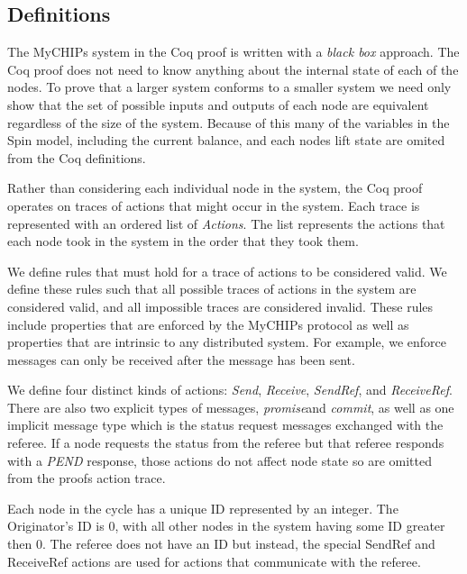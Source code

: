 \documentclass[runningheads]{llncs}
\newcommand{\promise}{\emph{promise}}
\newcommand{\commit}{\emph{commit}}
\newif\ifcomments
\newcommand{\krs}[1]{\ifcomments\textcolor{blue}{krs: #1}\fi}
\begin{document}
\subsection{Definitions} \label{sec:definitions}
The MyCHIPs system in the Coq proof is written with a \emph{black box} approach. The Coq proof does not need to know anything about the internal state of each of the nodes. To prove that a larger system conforms to a smaller system we need only show that the set of possible inputs and outputs of each node are equivalent regardless of the size of the system. Because of this many of the variables in the Spin model, including the current balance, and each nodes lift state are omited from the Coq definitions. 
\krs{We also omit some interactions between the originator and the referee. But the goal of including the originator at all is to provide context for the relay nodes. I need to adjust some language here to better reflect that.}

Rather than considering each individual node in the system, the Coq proof operates on traces of actions that might occur in the system. Each trace is represented with an ordered list of \emph{Actions}. The list represents the actions that each node took in the system in the order that they took them.

We define rules that must hold for a trace of actions to be considered valid. We define these rules such that all possible traces of actions in the system are considered valid, and all impossible traces are considered invalid. These rules include properties that are enforced by the MyCHIPs protocol as well as properties that are intrinsic to any distributed system. For example, we enforce  messages can only be received after the message has been sent.

We define four distinct kinds of actions: \emph{Send}, \emph{Receive}, \emph{SendRef}, and \emph{ReceiveRef}.
There are also two explicit types of messages, \promise and \commit, as well as one implicit message type which is the status request messages exchanged with the referee.
If a node requests the status from the referee but that referee responds with a \emph{PEND} response, those actions do not affect node state so are omitted from the proofs action trace.

Each node in the cycle has a unique ID represented by an integer. The Originator's ID is 0, with all other nodes in the system having some ID greater then 0. The referee does not have an ID but instead, the special SendRef and ReceiveRef actions are used for actions that communicate with the referee. 
\end{document}
